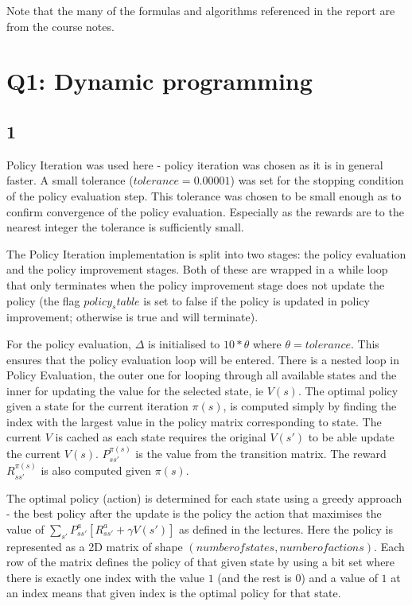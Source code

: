 
Note that the many of the formulas and algorithms referenced in the 
report are from the course notes.

\section*{Q1: Dynamic programming}
\subsection*{1}
Policy Iteration was used here - policy iteration was chosen as 
it is in general faster.
A small tolerance ($tolerance = 0.00001$) was set for the 
stopping condition of the policy evaluation step. This 
tolerance was chosen to be small enough as to confirm convergence 
of the policy evaluation. Especially as the rewards are to the 
nearest integer the tolerance is sufficiently small.

The Policy Iteration implementation is split into two
stages: the policy evaluation and the policy improvement stages.
Both of these are wrapped in a while loop that only terminates 
when the policy improvement stage does not update the policy 
(the flag $policy_stable$ is set to false if the policy is updated
in policy improvement; otherwise is true and will terminate).

For the policy evaluation, $\Delta$ is initialised to $10 * \theta$ 
where $\theta = tolerance$. This ensures that the policy evaluation
loop will be entered. 
There is a nested loop in Policy Evaluation, the outer one for looping 
through all available states and the inner for updating the value 
for the selected state, ie $V(s)$.
The optimal policy given a state for the current iteration $\pi(s)$,
is computed simply by finding the index with the largest value
in the policy matrix corresponding to state.
The current $V$ is cached as each state requires the original
$V(s')$ to be able update the current $V(s)$.
$P^{\pi(s)}_{s s'}$ is the value from the transition matrix. 
The reward $R^{\pi(s)}_{s s'}$ is also computed given $\pi(s)$.

The optimal policy (action) is determined for each state using a greedy
approach - the best policy after the update is the policy the action
that maximises the value of 
$\sum_{s'} P^a_{ss'}[R^a_{ss'} + \gamma V(s')]$ as defined in the lectures.
Here the policy is represented as a 2D matrix of shape 
$(number of states, number of actions)$. Each row of the matrix 
defines the policy of that given state by using a bit set where there 
is exactly one index with the value $1$ (and the rest is $0$) 
and a value of $1$ at an index means that given index is the optimal
policy for that state. 


